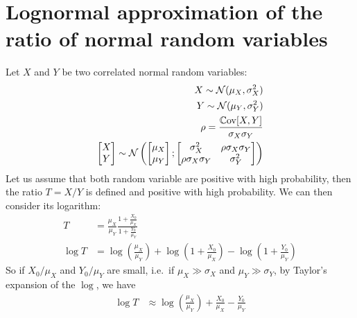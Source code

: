 \documentclass[../../Main_ManuscritThese.tex]{subfiles}
\begin{document}
  \section{Lognormal approximation of the ratio of normal random variables}
  \label{sec:lognorm_ratio}
  Let $X$ and $Y$ be two correlated normal random variables:
  \begin{align}
    X \sim \mathcal{N}(\mu_X, \sigma^2_X) \\
    Y \sim \mathcal{N}(\mu_Y, \sigma^2_Y) \\
    \rho = \frac{\Cov[X,Y]}{\sigma_X \sigma_Y} \\
    \begin{bmatrix}
      X \\ Y
    \end{bmatrix} \sim \mathcal{N}\left(%
    \begin{bmatrix}
      \mu_X \\ \mu_Y
    \end{bmatrix};%
    \begin{bmatrix}
      \sigma^2_X  & \rho \sigma_X \sigma_Y \\
      \rho\sigma_X \sigma_Y & \sigma^2_Y
    \end{bmatrix} \right)
  \end{align}
  Let us assume that both random variable are positive with high probability, then the ratio $T=X/Y$ is defined and positive with high probability. We can then consider its logarithm:
  \begin{align}
    T &= \frac{\mu_X}{\mu_Y}\frac{1 + \frac{X_0}{\mu_X}}{1 + \frac{Y_0}{\mu_Y}} \\
    \log T &= \log\left(\frac{\mu_X}{\mu_Y}\right) + \log\left(1 + \frac{X_0}{\mu_X}\right) -\log\left(1 + \frac{Y_0}{\mu_Y}\right)
  \end{align}
  So if $X_0 / \mu_X$ and $Y_0/ \mu_Y$ are small, i.e.\ if $\mu_X \gg \sigma_X$ and $\mu_Y \gg \sigma_Y$, by Taylor's expansion of the $\log$, we have
  \begin{align}
    \log T & \approx \log\left(\frac{\mu_X}{\mu_Y}\right) + \frac{X_0}{\mu_X} - \frac{Y_0}{\mu_Y}
  \end{align}
\end{document}
